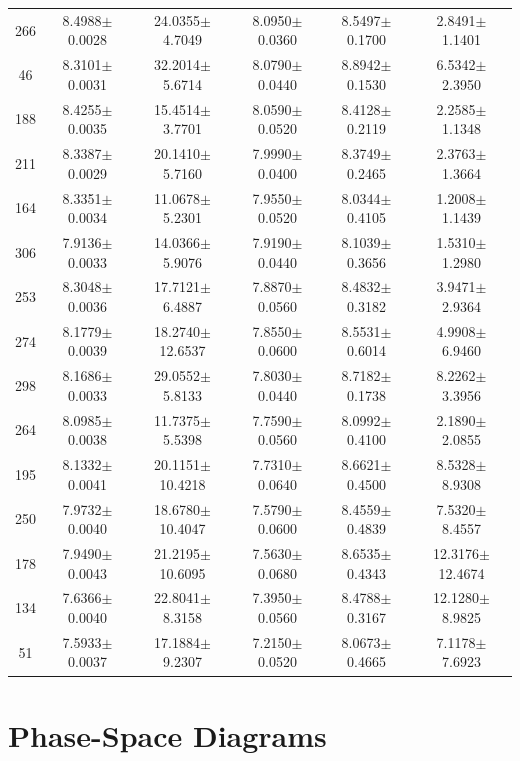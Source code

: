 \documentclass{aa}
\begin{document}
\begin{table}
\begin{center}
{{\begin{tabular}{|cccccc|}
266 & 8.4988$\pm$0.0028 & 24.0355$\pm$4.7049 & 8.0950$\pm$0.0360 & 8.5497$\pm$0.1700 & 2.8491$\pm$1.1401 \\
46 & 8.3101$\pm$0.0031 & 32.2014$\pm$5.6714 & 8.0790$\pm$0.0440 & 8.8942$\pm$0.1530 & 6.5342$\pm$2.3950 \\
188 & 8.4255$\pm$0.0035 & 15.4514$\pm$3.7701 & 8.0590$\pm$0.0520 & 8.4128$\pm$0.2119 & 2.2585$\pm$1.1348 \\
211 & 8.3387$\pm$0.0029 & 20.1410$\pm$5.7160 & 7.9990$\pm$0.0400 & 8.3749$\pm$0.2465 & 2.3763$\pm$1.3664 \\
164 & 8.3351$\pm$0.0034 & 11.0678$\pm$5.2301 & 7.9550$\pm$0.0520 & 8.0344$\pm$0.4105 & 1.2008$\pm$1.1439 \\
306 & 7.9136$\pm$0.0033 & 14.0366$\pm$5.9076 & 7.9190$\pm$0.0440 & 8.1039$\pm$0.3656 & 1.5310$\pm$1.2980 \\
253 & 8.3048$\pm$0.0036 & 17.7121$\pm$6.4887 & 7.8870$\pm$0.0560 & 8.4832$\pm$0.3182 & 3.9471$\pm$2.9364 \\
274 & 8.1779$\pm$0.0039 & 18.2740$\pm$12.6537 & 7.8550$\pm$0.0600 & 8.5531$\pm$0.6014 & 4.9908$\pm$6.9460 \\
298 & 8.1686$\pm$0.0033 & 29.0552$\pm$5.8133 & 7.8030$\pm$0.0440 & 8.7182$\pm$0.1738 & 8.2262$\pm$3.3956 \\
264 & 8.0985$\pm$0.0038 & 11.7375$\pm$5.5398 & 7.7590$\pm$0.0560 & 8.0992$\pm$0.4100 & 2.1890$\pm$2.0855 \\
195 & 8.1332$\pm$0.0041 & 20.1151$\pm$10.4218 & 7.7310$\pm$0.0640 & 8.6621$\pm$0.4500 & 8.5328$\pm$8.9308 \\
250 & 7.9732$\pm$0.0040 & 18.6780$\pm$10.4047 & 7.5790$\pm$0.0600 & 8.4559$\pm$0.4839 & 7.5320$\pm$8.4557 \\
178 & 7.9490$\pm$0.0043 & 21.2195$\pm$10.6095 & 7.5630$\pm$0.0680 & 8.6535$\pm$0.4343 & 12.3176$\pm$12.4674 \\
134 & 7.6366$\pm$0.0040 & 22.8041$\pm$8.3158 & 7.3950$\pm$0.0560 & 8.4788$\pm$0.3167 & 12.1280$\pm$8.9825 \\
51 & 7.5933$\pm$0.0037 & 17.1884$\pm$9.2307 & 7.2150$\pm$0.0520 & 8.0673$\pm$0.4665 & 7.1178$\pm$7.6923 \\ \hline
\end{tabular}
}}
\end{center}
\end{table}

\section{Phase-Space Diagrams}
\end{document}
